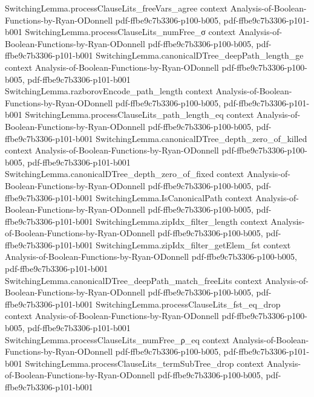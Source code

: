 \begin{theorem}
\proofstep
  {SwitchingLemma.processClauseLits_freeVars_agree}
  {context}
  {Analysis-of-Boolean-Functions-by-Ryan-ODonnell}
  {pdf-ffbe9c7b3306-p100-b005,
    pdf-ffbe9c7b3306-p101-b001}
\proofstep
  {SwitchingLemma.processClauseLits_numFree_σ}
  {context}
  {Analysis-of-Boolean-Functions-by-Ryan-ODonnell}
  {pdf-ffbe9c7b3306-p100-b005,
    pdf-ffbe9c7b3306-p101-b001}
\proofstep
  {SwitchingLemma.canonicalDTree_deepPath_length_ge}
  {context}
  {Analysis-of-Boolean-Functions-by-Ryan-ODonnell}
  {pdf-ffbe9c7b3306-p100-b005,
    pdf-ffbe9c7b3306-p101-b001}
\proofstep
  {SwitchingLemma.razborovEncode_path_length}
  {context}
  {Analysis-of-Boolean-Functions-by-Ryan-ODonnell}
  {pdf-ffbe9c7b3306-p100-b005,
    pdf-ffbe9c7b3306-p101-b001}
\proofstep
  {SwitchingLemma.processClauseLits_path_length_eq}
  {context}
  {Analysis-of-Boolean-Functions-by-Ryan-ODonnell}
  {pdf-ffbe9c7b3306-p100-b005,
    pdf-ffbe9c7b3306-p101-b001}
\proofstep
  {SwitchingLemma.canonicalDTree_depth_zero_of_killed}
  {context}
  {Analysis-of-Boolean-Functions-by-Ryan-ODonnell}
  {pdf-ffbe9c7b3306-p100-b005,
    pdf-ffbe9c7b3306-p101-b001}
\proofstep
  {SwitchingLemma.canonicalDTree_depth_zero_of_fixed}
  {context}
  {Analysis-of-Boolean-Functions-by-Ryan-ODonnell}
  {pdf-ffbe9c7b3306-p100-b005,
    pdf-ffbe9c7b3306-p101-b001}
\proofstep
  {SwitchingLemma.IsCanonicalPath}
  {context}
  {Analysis-of-Boolean-Functions-by-Ryan-ODonnell}
  {pdf-ffbe9c7b3306-p100-b005,
    pdf-ffbe9c7b3306-p101-b001}
\proofstep
  {SwitchingLemma.zipIdx_filter_length}
  {context}
  {Analysis-of-Boolean-Functions-by-Ryan-ODonnell}
  {pdf-ffbe9c7b3306-p100-b005,
    pdf-ffbe9c7b3306-p101-b001}
\proofstep
  {SwitchingLemma.zipIdx_filter_getElem_fst}
  {context}
  {Analysis-of-Boolean-Functions-by-Ryan-ODonnell}
  {pdf-ffbe9c7b3306-p100-b005,
    pdf-ffbe9c7b3306-p101-b001}
\proofstep
  {SwitchingLemma.canonicalDTree_deepPath_match_freeLits}
  {context}
  {Analysis-of-Boolean-Functions-by-Ryan-ODonnell}
  {pdf-ffbe9c7b3306-p100-b005,
    pdf-ffbe9c7b3306-p101-b001}
\proofstep
  {SwitchingLemma.processClauseLits_fst_eq_drop}
  {context}
  {Analysis-of-Boolean-Functions-by-Ryan-ODonnell}
  {pdf-ffbe9c7b3306-p100-b005,
    pdf-ffbe9c7b3306-p101-b001}
\proofstep
  {SwitchingLemma.processClauseLits_numFree_ρ_eq}
  {context}
  {Analysis-of-Boolean-Functions-by-Ryan-ODonnell}
  {pdf-ffbe9c7b3306-p100-b005,
    pdf-ffbe9c7b3306-p101-b001}
\proofstep
  {SwitchingLemma.processClauseLits_termSubTree_drop}
  {context}
  {Analysis-of-Boolean-Functions-by-Ryan-ODonnell}
  {pdf-ffbe9c7b3306-p100-b005,
    pdf-ffbe9c7b3306-p101-b001}

\end{theorem}

